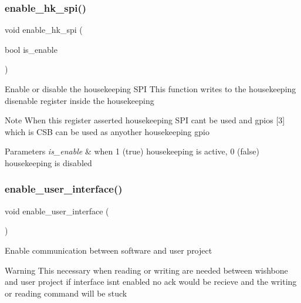 \subsubsection{\texorpdfstring{enable\+\_\+hk\+\_\+spi()}{enable\_hk\_spi()}}
{\footnotesize\ttfamily void enable\+\_\+hk\+\_\+spi (\begin{DoxyParamCaption}\item[{bool}]{is\+\_\+enable }\end{DoxyParamCaption})}

Enable or disable the housekeeping S\+PI This function writes to the housekeeping disenable register inside the housekeeping \begin{DoxyNote}{Note}
When this register asserted housekeeping S\+PI can\textquotesingle{}t be used and gpios \mbox{[}3\mbox{]} which is C\+SB can be used as anyother housekeeping gpio
\end{DoxyNote}

\begin{DoxyParams}{Parameters}
{\em is\+\_\+enable} & when 1 (true) housekeeping is active, 0 (false) housekeeping is disabled \\
\hline
\end{DoxyParams}
\mbox{\label{group__common_gaf79fbe355fd538621db12e3ae9e3e6b8}} 
\subsubsection{\texorpdfstring{enable\+\_\+user\+\_\+interface()}{enable\_user\_interface()}}
{\footnotesize\ttfamily void enable\+\_\+user\+\_\+interface (\begin{DoxyParamCaption}{ }\end{DoxyParamCaption})}

Enable communication  between software and user project \begin{DoxyWarning}{Warning}
This necessary when reading or writing are needed between wishbone and user project if interface isn\textquotesingle{}t enabled no ack would be recieve and the writing or reading command will be stuck 
\end{DoxyWarning}

